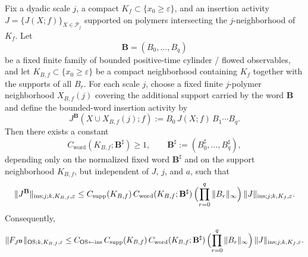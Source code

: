 \begin{corinsword}\label{cor:ins_to_OS_bounded_word}
Fix a dyadic scale $j$, a compact $K_f\subset\{x_0\ge \varepsilon\}$, and an insertion activity
$J=\{J(X;f)\}_{X\in\mathscr P_j}$ supported on polymers intersecting the $j$-neighborhood of $K_f$.
Let
\[
\mathbf B=(B_0,\dots,B_q)
\]
be a fixed finite family of bounded positive-time cylinder / flowed observables, and let
$K_{B,f}\subset\{x_0\ge \varepsilon\}$ be a compact neighborhood containing $K_f$ together with the supports of all $B_r$.
For each scale $j$, choose a fixed finite $j$-polymer neighborhood $X_{B,f}(j)$ covering the additional support carried by the word $\mathbf B$ and define the bounded-word insertion activity by
\[
J^{\mathbf B}(X\cup X_{B,f}(j);f):=B_0\,J(X;f)\,B_1\cdots B_q.
\]
Then there exists a constant
\[
C_{\mathrm{word}}(K_{B,f};\mathbf B^{\sharp})\ge 1,
\qquad
\mathbf B^{\sharp}:=(B_0^{\sharp},\dots,B_q^{\sharp}),
\]
depending only on the normalized fixed word $\mathbf B^{\sharp}$ and on the support neighborhood $K_{B,f}$, but independent of $J$, $j$, and $a$, such that
\begin{equation}\label{eq:ins_word_bound}
\|J^{\mathbf B}\|_{\mathrm{ins};j;k,K_{B,f},\varepsilon}
\le
C_{\mathrm{supp}}(K_{B,f})\,
C_{\mathrm{word}}(K_{B,f};\mathbf B^{\sharp})\,
\Bigl(\prod_{r=0}^{q}\|B_r\|_\infty\Bigr)\,
\|J\|_{\mathrm{ins};j;k,K_f,\varepsilon}.
\end{equation}
Consequently,
\begin{equation}\label{eq:OS_word_bound}
\|F_{J^{\mathbf B}}\|_{\mathrm{OS};k,K_{B,f},\varepsilon}
\le
C_{\mathrm{OS}\leftarrow\mathrm{ins}}\,
C_{\mathrm{supp}}(K_{B,f})\,
C_{\mathrm{word}}(K_{B,f};\mathbf B^{\sharp})\,
\Bigl(\prod_{r=0}^{q}\|B_r\|_\infty\Bigr)\,
\|J\|_{\mathrm{ins};j;k,K_f,\varepsilon}.
\end{equation}
\end{corinsword}

